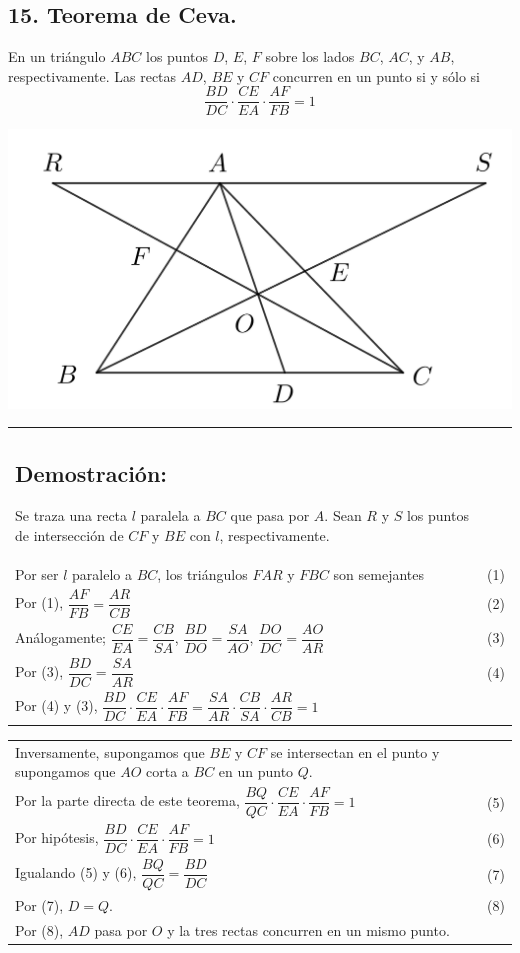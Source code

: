 \documentclass[12pt,a4paper]{article}
\begin{document}
\subsection*{15. Teorema de Ceva.}
En un triángulo $ABC$ los puntos $D$, $E$, $F$ sobre los lados $BC$, $AC$, y $AB$, respectivamente. Las rectas $AD$, $BE$ y $CF$ concurren en un punto si y sólo si
$$\dfrac{BD}{DC}\cdot\dfrac{CE}{EA}\cdot\dfrac{AF}{FB}=1$$
\begin{center}
\includegraphics[scale=0.8]{Imagenes/Ceva.png} 
\end{center}
\begin{tabular}{p{15.9 cm} p{1cm}}
\subsection*{Demostración:}
Se traza una recta $l$ paralela a $BC$ que pasa por $A$. Sean $R$ y $S$ los puntos de intersección de $CF$ y $BE$ con $l$, respectivamente.
\\Por ser $l$ paralelo a $BC$, los triángulos $FAR$ y $FBC$ son semejantes& (1)
\\Por (1), $\dfrac{AF}{FB}=\dfrac{AR}{CB}$&(2) 
\\Análogamente; $\dfrac{CE}{EA}=\dfrac{CB}{SA}$, $\dfrac{BD}{DO}=\dfrac{SA}{AO}$, $\dfrac{DO}{DC}=\dfrac{AO}{AR}$&(3)
\\Por (3), $\dfrac{BD}{DC}=\dfrac{SA}{AR}$&(4)
\\Por (4) y (3), $\dfrac{BD}{DC}\cdot \dfrac{CE}{EA}\cdot \dfrac{AF}{FB}=\dfrac{SA}{AR}\cdot \dfrac{CB}{SA}\cdot \dfrac{AR}{CB}=1$
\end{tabular}
\begin{tabular}{p{15.9 cm} p{1cm}}
\\Inversamente, supongamos que $BE$ y $CF$ se intersectan en el punto y supongamos que $AO$ corta a $BC$ en un punto $Q$. 
\\Por la parte directa de este teorema, $\dfrac{BQ}{QC}\cdot\dfrac{CE}{EA}\cdot\dfrac{AF}{FB}=1$ &(5)
\\Por hipótesis, $\dfrac{BD}{DC}\cdot\dfrac{CE}{EA}\cdot\dfrac{AF}{FB}=1$&(6)
\\Igualando (5) y (6), $\dfrac{BQ}{QC}=\dfrac{BD}{DC}$ &(7)
\\Por (7), $D=Q.$ &(8) 
\\Por (8), $AD$ pasa por $O$ y la tres rectas concurren en un mismo punto.
\end{tabular}
\end{document}
